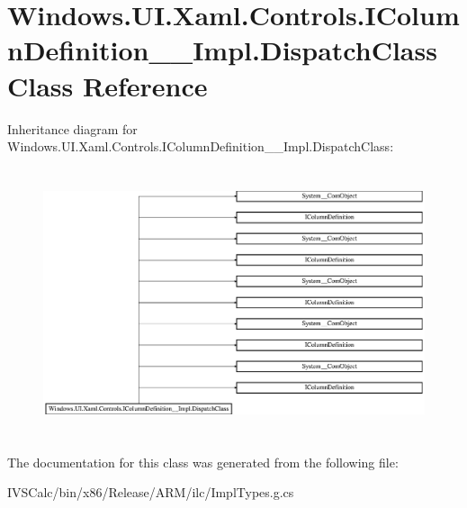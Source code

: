 \hypertarget{class_windows_1_1_u_i_1_1_xaml_1_1_controls_1_1_i_column_definition_____impl_1_1_dispatch_class}{}\section{Windows.\+U\+I.\+Xaml.\+Controls.\+I\+Column\+Definition\+\_\+\+\_\+\+Impl.\+Dispatch\+Class Class Reference}
\label{class_windows_1_1_u_i_1_1_xaml_1_1_controls_1_1_i_column_definition_____impl_1_1_dispatch_class}
Inheritance diagram for Windows.\+U\+I.\+Xaml.\+Controls.\+I\+Column\+Definition\+\_\+\+\_\+\+Impl.\+Dispatch\+Class\+:\begin{figure}[H]
\begin{center}
\leavevmode
\includegraphics[height=7.897436cm]{class_windows_1_1_u_i_1_1_xaml_1_1_controls_1_1_i_column_definition_____impl_1_1_dispatch_class}
\end{center}
\end{figure}


The documentation for this class was generated from the following file\+:\begin{DoxyCompactItemize}
\item 
I\+V\+S\+Calc/bin/x86/\+Release/\+A\+R\+M/ilc/Impl\+Types.\+g.\+cs\end{DoxyCompactItemize}
